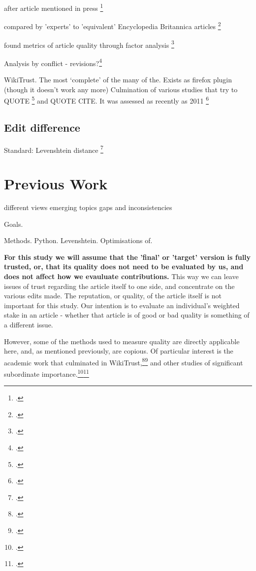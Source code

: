 \documentclass[a4paper,11pt,twoside,notitlepage]{article}
\renewcommand{\cite}[1]{\footcite{#1}}
\begin{document}
        after article mentioned in press \cite{Lih2004}

        compared by 'experts' to 'equivalent' Encyclopedia Britannica articles \cite{Giles2005}

        found metrics of article quality through factor analysis
        \cite{Stvilia2005}

        Analysis by conflict - revisions?\cite{Kittur2007}

        WikiTrust. The most `complete' of the many of the. Exists as
        firefox plugin (though it doesn't work any more) Culmination
        of various studies that try to QUOTE \cite{Adler2007} and QUOTE CITE. It
        was assessed as recently as 2011 \cite{Lucassen2011}
       
        \subsection{Edit difference}

        Standard: Levenshtein distance \cite{Levenshtein1966}
        

        \section{Previous Work}
        different views emerging topics gaps and inconsistencies

        Goals.

        Methods. Python. Levenshtein. Optimisations of.
     
        \textbf{For this study we will assume that the 'final' or
          'target' version is fully trusted, or, that its quality does
          not need to be evaluated by us, and does not affect how we
          evauluate contributions.} This way we can leave issues of
        trust regarding the article itself to one side, and
        concentrate on the various edits made. The reputation, or
        quality, of the article itself is not important for this
        study. Our intention is to evaluate an individual's weighted
        stake in an article - whether that article is of good or bad
        quality is something of a different issue.

        However, some of the methods used to measure quality are
        directly applicable here, and, as mentioned previously, are
        copious. Of particular interest is the academic work that
        culminated in WikiTrust,\cite{Adler2006}\cite{Adler2007} and
        other studies of significant subordinate
        importance.\cite{Zeng2006}\cite{Cross2006}
\end{document}
